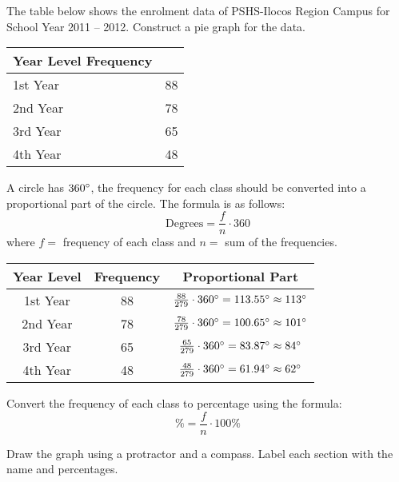 \begin{example}
\Item The table below shows the enrolment data of PSHS-Ilocos Region
Campus for School Year 2011 – 2012. Construct a pie graph for the data.
\begin{center}
\begin{tabular}{ll}
\hline \hline
Year Level Frequency\\
\hline
1st Year & 88\\
2nd Year & 78\\
3rd Year & 65\\
4th Year & 48\\
\hline 
\end{tabular}
\end{center}
\Solution
\begin{myenumerate}
\item A circle has $360\mathrm{^{\circ}}$, the frequency for each class should be converted into a
proportional part of the circle. The formula is as follows:
\begin{equation*}
\text{Degrees}=\frac{f}{n}\cdot360
\end{equation*}
where $f =$ frequency of each class and $n =$ sum of the frequencies.
\begin{center}
\begin{tabular}{ccc}
\hline \hline 
Year Level & Frequency & Proportional Part\\
\hline 
1st Year & 88 & $\frac{88}{279}\cdot360\mathrm{^{\circ}}=113.55\mathrm{^{\circ}}\approx 113\mathrm{^{\circ}}$\\
2nd Year & 78 & $\frac{78}{279}\cdot360\mathrm{^{\circ}}=100.65\mathrm{^{\circ}}\approx 101\mathrm{^{\circ}}$\\
3rd Year & 65 & $\frac{65}{279}\cdot360\mathrm{^{\circ}}=83.87\mathrm{^{\circ}}\approx 84\mathrm{^{\circ}}$\\
4th Year & 48 & $\frac{48}{279}\cdot360\mathrm{^{\circ}}=61.94\mathrm{^{\circ}}\approx 62\mathrm{^{\circ}}$\\
\end{tabular}
\end{center}
\item Convert the frequency of each class to percentage using the formula:
\begin{equation*}
\%=\frac{f}{n}\cdot100\%
\end{equation*}
\item Draw the graph using a protractor and a compass. Label each section with the name and percentages.
\begin{center}
\label{chap10fig:1}
\end{center}
\end{myenumerate}


\end{example}
